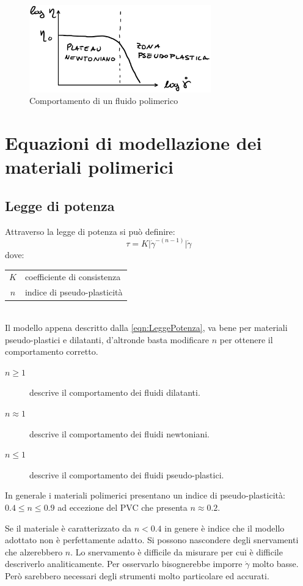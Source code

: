 \begin{figure}
\centering
\includegraphics[width = 0.7\textwidth]{gfx/PseudoPlastico}
\caption{Comportamento di un fluido polimerico}
\label{fig:PesudoPlastico}
\end{figure}

\section{Equazioni di modellazione dei materiali polimerici}
\subsection{Legge di potenza}
Attraverso la legge di potenza si può definire:
\begin{equation}
\tau = K \lvert \dot{\gamma}^{-(n-1)}\rvert\dot{\gamma}
\label{eqn:LeggePotenza}
\end{equation}
dove:\\
\begin{tabular}{cl}
$K$ & coefficiente di consistenza\\
$n$ & indice di pseudo-plasticità
\end{tabular}\\
Il modello appena descritto dalla \eqref{eqn:LeggePotenza}, va bene per materiali pseudo-plastici e dilatanti, d'altronde basta modificare $n$ per ottenere il comportamento corretto.
\begin{description}
\item[$n\geq 1$] descrive il comportamento dei fluidi dilatanti.
\item[$n \approx 1$] descrive il comportamento dei fluidi newtoniani.
\item[$n \leq 1$] descrive il comportamento dei fluidi pseudo-plastici.
\end{description}

In generale i materiali polimerici presentano un indice di pseudo-plasticità:
$0.4 \leq n \leq 0.9$ ad eccezione del \ac{PVC} che presenta $n \approx 0.2$.

Se il materiale è caratterizzato da $n < 0.4$ in genere è indice che il modello adottato non è perfettamente adatto.
Si possono nascondere degli snervamenti che alzerebbero $n$.
Lo snervamento è difficile da misurare per cui è difficile descriverlo analiticamente.
Per osservarlo bisognerebbe imporre $\dot{\gamma}$ molto basse. Però sarebbero necessari degli strumenti molto particolare ed accurati.

